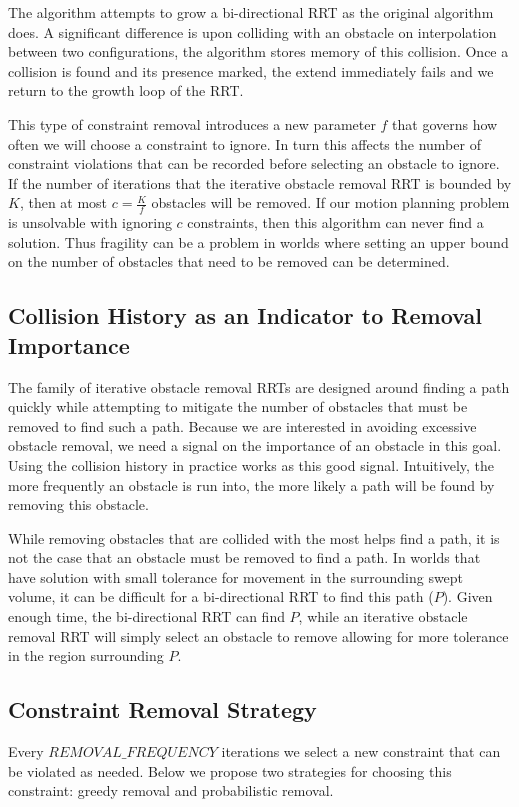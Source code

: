 The algorithm attempts to grow a bi-directional RRT as the original algorithm does. A significant difference is upon colliding with an obstacle on interpolation between two configurations, the algorithm stores memory of this collision. Once a collision is found and its presence marked, the extend immediately fails and we return to the growth loop of the RRT. 

This type of constraint removal introduces a new parameter $f$ that governs how often we will choose a constraint to ignore. In turn this affects the number of constraint violations that can be recorded before selecting an obstacle to ignore. If the number of iterations that the iterative obstacle removal RRT is bounded by $K$, then at most $c=\frac{K}{f}$ obstacles will be removed. If our motion planning problem is unsolvable with ignoring $c$ constraints, then this algorithm can never find a solution. Thus fragility can be a problem in worlds where setting an upper bound on the number of obstacles that need to be removed can be determined.

\subsection{Collision History as an Indicator to Removal Importance}
The family of iterative obstacle removal RRTs are designed around finding a path quickly while attempting to mitigate the number of obstacles that must be removed to find such a path. Because we are interested in avoiding excessive obstacle removal, we need a signal on the importance of an obstacle in this goal. Using the collision history in practice works as this good signal. Intuitively, the more frequently an obstacle is run into, the more likely a path will be found by removing this obstacle.

While removing obstacles that are collided with the most helps find a path, it is not the case that an obstacle must be removed to find a path. In worlds that have solution with small tolerance for movement in the surrounding swept volume, it can be difficult for a bi-directional RRT to find this path ($P$). Given enough time, the bi-directional RRT can find $P$, while an iterative obstacle removal RRT will simply select an obstacle to remove allowing for more tolerance in the region surrounding $P$.

\subsection{Constraint Removal Strategy}
Every $REMOVAL\_FREQUENCY$ iterations we select a new constraint that can be violated as needed. Below we propose two strategies for choosing this constraint: greedy removal and probabilistic removal.
